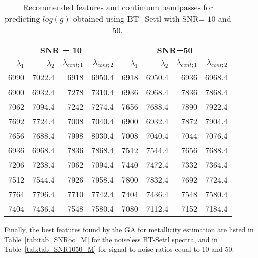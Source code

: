 \begin{table}
\begin{center}
\begin{tabular}{rrrr | rrrr}
  \hline
 \multicolumn{4}{c}{SNR = 10} &  \multicolumn{4}{c}{SNR=50} \\
  \hline
$\lambda_1$ & $\lambda_2$ & $\lambda_{cont;1}$ & $\lambda_{cont;2} $ & $\lambda_1$ & $\lambda_2$ & $\lambda_{cont;1}$ & $\lambda_{cont;2} $ \\ 
  \hline

6990 & 7022.4 &	6918 & 6950.4 & 6918 & 6950.4 & 6936 & 6968.4  \\
6900 & 6932.4 &	7278 & 7310.4 & 6936 & 6968.4 & 7836 & 7868.4  \\
7062 & 7094.4 &	7242 & 7274.4 & 7656 & 7688.4 & 7890 & 7922.4  \\
7692 & 7724.4 &	7008 & 7040.4 & 6900 & 6932.4 & 7872 & 7904.4  \\
7656 & 7688.4 &	7998 & 8030.4 & 7008 & 7040.4 & 7044 & 7076.4  \\
6936 & 6968.4 &	7836 & 7868.4 & 7512 & 7544.4 & 7656 & 7688.4  \\
7206 & 7238.4 &	7062 & 7094.4 & 7440 & 7472.4 & 7332 & 7364.4  \\
7512 & 7544.4 &	7926 & 7958.4 & 7800 & 7832.4 & 7692 & 7724.4  \\
7764 & 7796.4 &	7710 & 7742.4 & 7404 & 7436.4 & 7548 & 7580.4  \\
7404 & 7436.4 &	7548 & 7580.4 & 7080 & 7112.4 & 7152 & 7184.4  \\
   \hline
\end{tabular}
\caption {Recommended features and continuum bandpasses for predicting $log(g)$ 
      obtained using BT\_Settl with SNR= $10$ and
      50.} \label{tab:tab_SNR1050_G}
\end{center}
\end{table}


Finally, the best features found by the GA for metallicity estimation
are listed in Table~\ref{tab:tab_SNRoo_M} for the noiseless BT-Settl
spectra, and in Table~\ref{tab:tab_SNR1050_M} for signal-to-noise
ratios equal to 10 and 50.

